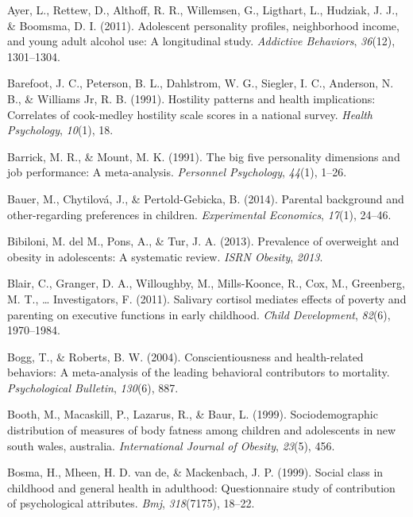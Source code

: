 \documentclass[man]{apa6}
\begin{document}
\leavevmode\hypertarget{ref-ayer2011adolescent}{}%
Ayer, L., Rettew, D., Althoff, R. R., Willemsen, G., Ligthart, L., Hudziak, J. J., \& Boomsma, D. I. (2011). Adolescent personality profiles, neighborhood income, and young adult alcohol use: A longitudinal study. \emph{Addictive Behaviors}, \emph{36}(12), 1301--1304.

\leavevmode\hypertarget{ref-barefoot1991hostility}{}%
Barefoot, J. C., Peterson, B. L., Dahlstrom, W. G., Siegler, I. C., Anderson, N. B., \& Williams Jr, R. B. (1991). Hostility patterns and health implications: Correlates of cook-medley hostility scale scores in a national survey. \emph{Health Psychology}, \emph{10}(1), 18.

\leavevmode\hypertarget{ref-barrick1991big}{}%
Barrick, M. R., \& Mount, M. K. (1991). The big five personality dimensions and job performance: A meta-analysis. \emph{Personnel Psychology}, \emph{44}(1), 1--26.

\leavevmode\hypertarget{ref-bauer2014parental}{}%
Bauer, M., Chytilová, J., \& Pertold-Gebicka, B. (2014). Parental background and other-regarding preferences in children. \emph{Experimental Economics}, \emph{17}(1), 24--46.

\leavevmode\hypertarget{ref-bibiloni2013prevalence}{}%
Bibiloni, M. del M., Pons, A., \& Tur, J. A. (2013). Prevalence of overweight and obesity in adolescents: A systematic review. \emph{ISRN Obesity}, \emph{2013}.

\leavevmode\hypertarget{ref-blair2011salivary}{}%
Blair, C., Granger, D. A., Willoughby, M., Mills-Koonce, R., Cox, M., Greenberg, M. T., \ldots{} Investigators, F. (2011). Salivary cortisol mediates effects of poverty and parenting on executive functions in early childhood. \emph{Child Development}, \emph{82}(6), 1970--1984.

\leavevmode\hypertarget{ref-bogg2004conscientiousness}{}%
Bogg, T., \& Roberts, B. W. (2004). Conscientiousness and health-related behaviors: A meta-analysis of the leading behavioral contributors to mortality. \emph{Psychological Bulletin}, \emph{130}(6), 887.

\leavevmode\hypertarget{ref-booth1999sociodemographic}{}%
Booth, M., Macaskill, P., Lazarus, R., \& Baur, L. (1999). Sociodemographic distribution of measures of body fatness among children and adolescents in new south wales, australia. \emph{International Journal of Obesity}, \emph{23}(5), 456.

\leavevmode\hypertarget{ref-bosma1999social}{}%
Bosma, H., Mheen, H. D. van de, \& Mackenbach, J. P. (1999). Social class in childhood and general health in adulthood: Questionnaire study of contribution of psychological attributes. \emph{Bmj}, \emph{318}(7175), 18--22.
\end{document}
